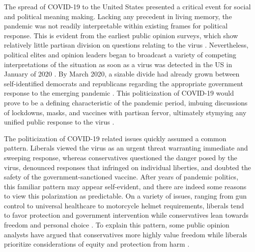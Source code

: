 \documentclass{article}
\begin{document}
The spread of COVID-19 to the United States presented a critical event
for social and political meaning making. Lacking any precedent in living
memory, the pandemic was not readily interpretable within existing
frames for political response. This is evident from the earliest public
opinion surveys, which show relatively little partisan division on
questions relating to the virus
\parencite{Deane_undated-zp}. Nevertheless, political elites and opinion leaders began to
broadcast a variety of competing interpretations of the situation as
soon as a virus was detected in the US in January of 2020
\parencite{Stokes2020-vw}. By
March 2020, a sizable divide had already grown between self-identified
democrats and republicans regarding the appropriate government response
to the emerging pandemic
\parencite{Gadarian2021-su}. This
politicization of COVID-19 would prove to be a defining characteristic
of the pandemic period, imbuing discussions of lockdowns, masks, and
vaccines with partisan fervor, ultimately stymying any unified public
response to the virus
\parencite{Albrecht2022-kj, Allcott2020-iy, Chen2022-eb}.

The politicization of COVID-19 related issues quickly assumed a common
pattern. Liberals viewed the virus as an urgent threat warranting
immediate and sweeping response, whereas conservatives questioned the
danger posed by the virus, denounced responses that infringed on
individual liberties, and doubted the safety of the
government-sanctioned vaccine. After years of pandemic politics, this
familiar pattern may appear self-evident, and there are indeed some
reasons to view this polarization as predictable. On a variety of
issues, ranging from gun control to universal healthcare to motorcycle
helmet requirements, liberals tend to favor protection and government
intervention while conservatives lean towards freedom and personal
choice \parencite{Homer2009-gw}. To explain this pattern, some public opinion analysts have
argued that conservatives more highly value freedom while liberals
prioritize considerations of equity and protection from harm \parencite{Feldman1992-lf, Haidt2012-fy}.
\end{document}
